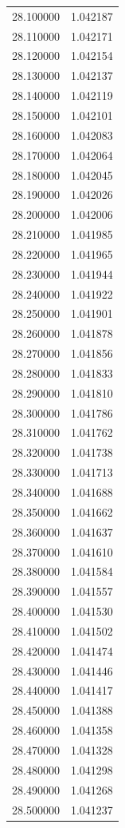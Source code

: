 \begin{tabular}{rr}
28.100000 & 1.042187 \\
28.110000 & 1.042171 \\
28.120000 & 1.042154 \\
28.130000 & 1.042137 \\
28.140000 & 1.042119 \\
28.150000 & 1.042101 \\
28.160000 & 1.042083 \\
28.170000 & 1.042064 \\
28.180000 & 1.042045 \\
28.190000 & 1.042026 \\
28.200000 & 1.042006 \\
28.210000 & 1.041985 \\
28.220000 & 1.041965 \\
28.230000 & 1.041944 \\
28.240000 & 1.041922 \\
28.250000 & 1.041901 \\
28.260000 & 1.041878 \\
28.270000 & 1.041856 \\
28.280000 & 1.041833 \\
28.290000 & 1.041810 \\
28.300000 & 1.041786 \\
28.310000 & 1.041762 \\
28.320000 & 1.041738 \\
28.330000 & 1.041713 \\
28.340000 & 1.041688 \\
28.350000 & 1.041662 \\
28.360000 & 1.041637 \\
28.370000 & 1.041610 \\
28.380000 & 1.041584 \\
28.390000 & 1.041557 \\
28.400000 & 1.041530 \\
28.410000 & 1.041502 \\
28.420000 & 1.041474 \\
28.430000 & 1.041446 \\
28.440000 & 1.041417 \\
28.450000 & 1.041388 \\
28.460000 & 1.041358 \\
28.470000 & 1.041328 \\
28.480000 & 1.041298 \\
28.490000 & 1.041268 \\
28.500000 & 1.041237 \\

\end{tabular}
